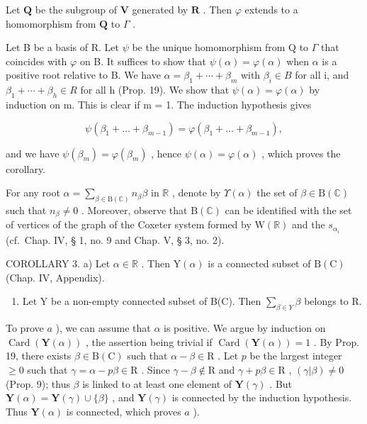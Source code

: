 Let \(\mathbf{Q}\) be the subgroup of \(\mathbf{V}\) generated by \(\mathbf{R}\) . Then \(\varphi\) extends to a homomorphism from \(\mathbf{Q}\) to \(\Gamma\) .

Let B be a basis of R. Let \(\psi\) be the unique homomorphism from Q to \(\Gamma\) that coincides with \(\varphi\) on B. It suffices to show that \(\psi(\alpha) = \varphi(\alpha)\) when \(\alpha\) is a positive root relative to B. We have \(\alpha = \beta_{1} + \cdots + \beta_{m}\) with \(\beta_{i} \in B\) for all i, and \(\beta_{1} + \cdots + \beta_{h} \in R\) for all h (Prop. 19). We show that \(\psi(\alpha) = \varphi(\alpha)\) by induction on m. This is clear if m = 1. The induction hypothesis gives

\[
\psi \left(\beta_ {1} + \dots + \beta_ {m - 1}\right) = \varphi \left(\beta_ {1} + \dots + \beta_ {m - 1}\right),
\]

and we have \(\psi (\beta_m) = \varphi (\beta_m)\) , hence \(\psi (\alpha) = \varphi (\alpha)\) , which proves the corollary.

For any root \(\alpha = \sum_{\beta \in \mathrm{B}(\mathbb{C})} n_{\beta} \beta\) in \(\mathbb{R}\) , denote by \(\Upsilon(\alpha)\) the set of \(\beta \in \mathrm{B}(\mathbb{C})\) such that \(n_{\beta} \neq 0\) . Moreover, observe that \(\mathrm{B}(\mathbb{C})\) can be identified with the set of vertices of the graph of the Coxeter system formed by \(\mathrm{W}(\mathbb{R})\) and the \(s_{\alpha_i}\) (cf.~Chap. IV, § 1, no. 9 and Chap. V, § 3, no. 2).

COROLLARY 3. a) Let \(\alpha \in \mathbb{R}\) . Then \(\mathrm{Y}(\alpha)\) is a connected subset of \(\mathrm{B}(\mathrm{C})\) (Chap. IV, Appendix).

\begin{enumerate}
\def\labelenumi{\alph{enumi})}
\setcounter{enumi}{1}
\tightlist
\item
  Let Y be a non-empty connected subset of B(C). Then \(\sum_{\beta\in Y}\beta\) belongs to R.
\end{enumerate}

To prove \(a\) ), we can assume that \(\alpha\) is positive. We argue by induction on \(\operatorname{Card}(\mathbf{Y}(\alpha))\) , the assertion being trivial if \(\operatorname{Card}(\mathbf{Y}(\alpha)) = 1\) . By Prop. 19, there exists \(\beta \in \mathrm{B}(\mathrm{C})\) such that \(\alpha - \beta \in \mathrm{R}\) . Let \(p\) be the largest integer \(\geqslant 0\) such that \(\gamma = \alpha - p\beta \in \mathrm{R}\) . Since \(\gamma - \beta \notin \mathrm{R}\) and \(\gamma + p\beta \in \mathrm{R}\) , \((\gamma|\beta) \neq 0\) (Prop. 9); thus \(\beta\) is linked to at least one element of \(\mathbf{Y}(\gamma)\) . But \(\mathbf{Y}(\alpha) = \mathbf{Y}(\gamma) \cup \{\beta\}\) , and \(\mathbf{Y}(\gamma)\) is connected by the induction hypothesis. Thus \(\mathbf{Y}(\alpha)\) is connected, which proves \(a\) ).

